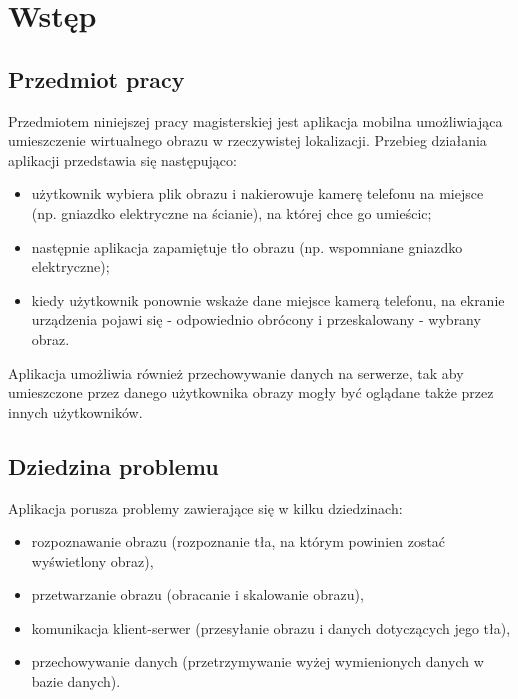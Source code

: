 \chapter{Wstęp}

\section{Przedmiot pracy}

Przedmiotem niniejszej pracy magisterskiej jest aplikacja mobilna umożliwiająca umieszczenie wirtualnego obrazu w rzeczywistej lokalizacji.
Przebieg działania aplikacji przedstawia się następująco:
\begin{itemize}
 \item użytkownik wybiera plik obrazu i nakierowuje kamerę telefonu na miejsce (np. gniazdko elektryczne na ścianie), na której chce go umieścic;
 \item następnie aplikacja zapamiętuje tło obrazu (np. wspomniane gniazdko elektryczne);
 \item kiedy użytkownik ponownie wskaże dane miejsce kamerą telefonu, na ekranie urządzenia pojawi się - odpowiednio obrócony i przeskalowany - wybrany obraz.
\end{itemize}

Aplikacja umożliwia również przechowywanie danych na serwerze, tak aby umieszczone przez danego użytkownika obrazy mogły być oglądane także przez innych użytkowników.



\section{Dziedzina problemu}
Aplikacja porusza problemy zawierające się w kilku dziedzinach:

\begin{itemize}
 \item rozpoznawanie obrazu (rozpoznanie tła, na którym powinien zostać wyświetlony obraz),
 \item przetwarzanie obrazu (obracanie i skalowanie obrazu),
 \item komunikacja klient-serwer (przesyłanie obrazu i danych dotyczących jego tła),
 \item przechowywanie danych (przetrzymywanie wyżej wymienionych danych w bazie danych).
\end{itemize}


